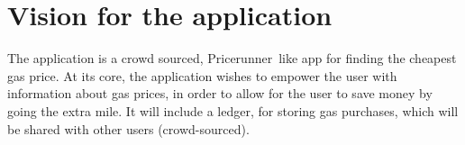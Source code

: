 
\chapter{Vision for the application}
The application is a crowd sourced, Pricerunner\texttrademark\ like app for finding the cheapest gas price. At its core, the application wishes to empower the user with information about gas prices, in order to allow for the user to save money by going the extra mile. It will include a ledger, for storing gas purchases, which will be shared with other users (crowd-sourced).
